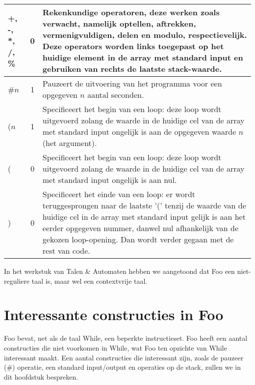 \documentclass[11pt]{article}
\begin{document}
\begin{center}
\begin{tabular}{ | l | c | p{12cm} | }
    +, -, *, /, \%                          & 0 & Rekenkundige operatoren, deze werken zoals verwacht, namelijk optellen, aftrekken, vermenigvuldigen, delen en modulo, respectievelijk. Deze operators worden links toegepast op het huidige element in de array met standard input en gebruiken van rechts de laatste stack-waarde. \\ \hline
    \#\(n\)                                 & 1 & Pauzeert de uitvoering van het programma voor een opgegeven \(n\) aantal seconden. \\ \hline %
    (\(n\)                                  & 1 & Specificeert het begin van een loop: deze loop wordt uitgevoerd zolang de waarde in de huidige cel van de array met standard input ongelijk is aan de opgegeven waarde \(n\) (het argument). \\ \hline
    (                                       & 0 & Specificeert het begin van een loop: deze loop wordt uitgevoerd zolang de waarde in de huidige cel van de array met standard input ongelijk is aan nul. \\ \hline
    )                                       & 0 & Specificeert het einde van een loop: er wordt teruggesprongen naar de laatste '(' tenzij de waarde van de huidige cel in de array met standard input gelijk is aan het eerder opgegeven nummer, danwel nul afhankelijk van de gekozen loop-opening. Dan wordt verder gegaan met de rest van code. \\ \hline
    \hline
    \end{tabular}
\end{center}


In het werkstuk van Talen \& Automaten hebben we aangetoond dat Foo een niet-reguliere taal is, maar wel een contextvrije taal.

\section{Interessante constructies in Foo}

Foo bevat, net als de taal While, een beperkte instructieset. 
Foo heeft een aantal constructies die niet voorkomen in While, wat Foo ten opzichte van While interessant maakt.
Een aantal constructies die interessant zijn, zoals de pauzeer (\#) operatie, een standard input/output en operaties op de stack, zullen we in dit hoofdstuk bespreken. %
\end{document}
